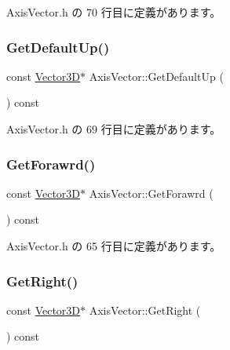  Axis\+Vector.\+h の 70 行目に定義があります。

\mbox{\label{class_axis_vector_a32f68ef0864e7b589d3c1996a61e11fc}} 
\subsubsection{\texorpdfstring{Get\+Default\+Up()}{GetDefaultUp()}}
{\footnotesize\ttfamily const \mbox{\hyperlink{class_vector3_d}{Vector3D}}$\ast$ Axis\+Vector\+::\+Get\+Default\+Up (\begin{DoxyParamCaption}{ }\end{DoxyParamCaption}) const\hspace{0.3cm}{\ttfamily [inline]}}



 Axis\+Vector.\+h の 69 行目に定義があります。

\mbox{\label{class_axis_vector_a79013d5b090ce9232d57f528f18e982e}} 
\subsubsection{\texorpdfstring{Get\+Forawrd()}{GetForawrd()}}
{\footnotesize\ttfamily const \mbox{\hyperlink{class_vector3_d}{Vector3D}}$\ast$ Axis\+Vector\+::\+Get\+Forawrd (\begin{DoxyParamCaption}{ }\end{DoxyParamCaption}) const\hspace{0.3cm}{\ttfamily [inline]}}



 Axis\+Vector.\+h の 65 行目に定義があります。

\mbox{\label{class_axis_vector_a1d4f944d118d6f999c516dbdc0827a39}} 
\subsubsection{\texorpdfstring{Get\+Right()}{GetRight()}}
{\footnotesize\ttfamily const \mbox{\hyperlink{class_vector3_d}{Vector3D}}$\ast$ Axis\+Vector\+::\+Get\+Right (\begin{DoxyParamCaption}{ }\end{DoxyParamCaption}) const\hspace{0.3cm}{\ttfamily [inline]}}



